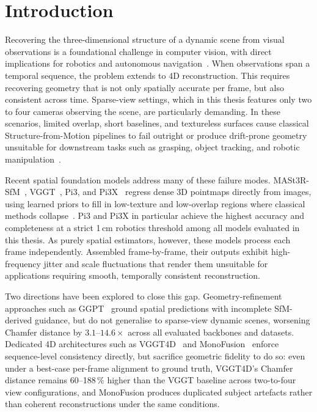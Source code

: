 \chapter{Introduction}\label{c:introduction}

Recovering the three-dimensional structure of a dynamic scene from visual observations is a
foundational challenge in computer vision, with direct implications for robotics and
autonomous navigation~\cite{hartley2004multiple}. When observations span a temporal
sequence, the problem extends to 4D reconstruction. This requires recovering geometry that is not only
spatially accurate per frame, but also consistent across time. Sparse-view settings, which in this thesis features only two to
four cameras observing the scene, are particularly demanding. In these scenarios, limited overlap, short baselines,
and textureless surfaces cause classical Structure-from-Motion pipelines to fail outright or
produce drift-prone geometry unsuitable for downstream tasks such as grasping, object
tracking, and robotic manipulation~\cite{schoenberger2016sfm, hartley2004multiple}.

Recent spatial foundation models address many of these failure modes. MASt3R-SfM~\cite{mast3r},
VGGT~\cite{vggt}, Pi3, and Pi3X~\cite{pi3} regress dense 3D pointmaps directly from images,
using learned priors to fill in low-texture and low-overlap regions where classical methods
collapse~\cite{dust3r, mast3r}. Pi3 and Pi3X in particular achieve the highest accuracy and completeness at a
strict 1\,cm robotics threshold among all models evaluated in this thesis. As purely spatial
estimators, however, these models process each frame independently. Assembled
frame-by-frame, their outputs exhibit high-frequency jitter and scale fluctuations that
render them unsuitable for applications requiring smooth, temporally consistent reconstruction.

Two directions have been explored to close this gap. Geometry-refinement approaches such as
GGPT~\cite{ggpt} ground spatial predictions with incomplete SfM-derived guidance, but do not
generalise to sparse-view dynamic scenes, worsening Chamfer distance by $3.1$--$14.6\times$
across all evaluated backbones and datasets. Dedicated 4D architectures such as VGGT4D~\cite{vggt4d} and
MonoFusion~\cite{monofusion} enforce sequence-level consistency directly, but sacrifice
geometric fidelity to do so: even under a best-case per-frame alignment to ground truth,
VGGT4D's Chamfer distance remains 60--188\,\% higher than the VGGT baseline across
two-to-four view configurations, and MonoFusion produces duplicated subject artefacts rather
than coherent reconstructions under the same conditions.

